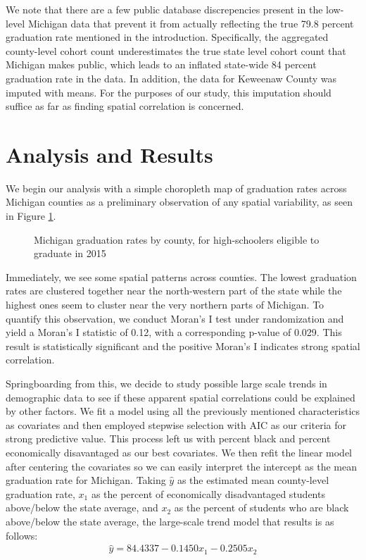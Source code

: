 \documentclass[12pt,letterpaper]{article}
\begin{document}
We note that there are a few public database discrepencies present in the low-level Michigan data that prevent it from actually reflecting the true 79.8 percent graduation rate mentioned in the introduction. Specifically, the aggregated county-level cohort count underestimates the true state level cohort count that Michigan makes public, which leads to an inflated state-wide 84 percent graduation rate in the data. In addition, the data for Keweenaw County was imputed with means. For the purposes of our study, this imputation should suffice as far as finding spatial correlation is concerned. 

\section{Analysis and Results}

We begin our analysis with a simple choropleth map of graduation rates across Michigan counties as a preliminary observation of any spatial variability, as seen in Figure \ref{lab:grad_rts}.

\begin{figure}[h!]
\caption{Michigan graduation rates by county, for high-schoolers eligible to graduate in 2015}
\centering
\scalebox{1}{
\trimbox{0cm 2cm 0cm 0cm}{}
}
\label{lab:grad_rts}
\end{figure}
Immediately, we see some spatial patterns across counties. The lowest graduation rates are clustered together near the north-western part of the state while the highest ones seem to cluster near the very northern parts of Michigan. To quantify this observation, we conduct Moran's I test under randomization and yield a Moran's I statistic of 0.12, with a corresponding p-value of 0.029. This result is statistically significant and the positive Moran's I indicates strong spatial correlation. 

Springboarding from this, we decide to study possible large scale trends in demographic data to see if these apparent spatial correlations could be explained by other factors. We fit a model using all the previously mentioned characteristics as covariates and then employed stepwise selection with AIC as our criteria for strong predictive value. This process left us with percent black and percent economically disavantaged as our best covariates. We then refit the linear model after centering the covariates so we can easily interpret the intercept as the mean graduation rate for Michigan. Taking $\hat{y}$ as the estimated mean county-level graduation rate, $x_1$ as the percent of economically disadvantaged students above/below the state average, and $x_2$ as the percent of students who are black above/below the state average, the large-scale trend model that results is as follows: 
\begin{align*}\label{eq:pareto mle2}
\hat{y} = 84.4337 - 0.1450x_1           -0.2505x_2
\end{align*}
\end{document}
